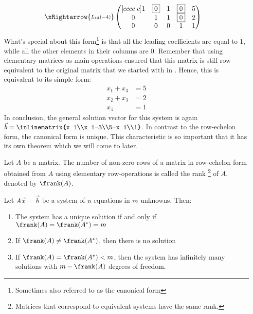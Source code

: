 \begin{exm}
\begin{align*}
		\xRightarrow{\substack{L_{13}(-4)}}
		 & \begin{pmatrix}[cccc|c]
			1 & \boxed{0} & 1 & \boxed{0} & 5 \\
			0 & 1         & 1 & \boxed{0} & 2 \\
			0 & 0         & 0 & 1         & 1 \\
		\end{pmatrix}
	\end{align*}
	What's special about this form\footnote{Sometimes also referred to as the
		canonical form} is that all the leading coefficients are equal to $1$, while
	all the other elements in their columns are $0$. Remember that using elementary
	matrices as main operations ensured that this matrix is still row-equivalent
	to the original matrix that we started with in .
	Hence, this is equivalent to its simple form:
	\begin{align*}
		x_1 + x_3 & = 5 \\
		x_2 + x_3 & = 2 \\
		x_4       & = 1
	\end{align*}
	In conclusion, the general solution vector for this system is again
	$\vec{b}=\inlinematrix{x_1\\x_1-3\\5-x_1\\1}$.
	In contrast to the row-echelon form, the canonical form is unique. This
	characteristic is so important that it has its own theorem which we will come
	to later.
\end{exm}

\begin{definition}\label{def-matrix-rank}
	Let $A$ be a matrix. The number of non-zero rows of a matrix in row-echelon
	form obtained from $A$ using elementary row-operations is called the rank
	\footnote{Matrices that correspond to equivalent systems have the
		same rank.} of $A$, denoted by $\frank(A)$.
\end{definition}

\begin{thm}\label{thm-rank}
	Let $A\vec{x}=\vec{b}$ be a system of $n$ equations in $m$ unknowns. Then:
	\begin{enumerate}
		\item The system has a unique solution if and only if $\frank(A)=\frank(A^*)=m$
		\item If $\frank(A)\neq\frank(A^*)$, then there is no solution
		\item If $\frank(A)=\frank(A^*)<m$, then the system has infinitely many
		      solutions with $m-\frank(A)$ degrees of freedom.
	\end{enumerate}
\end{thm}

